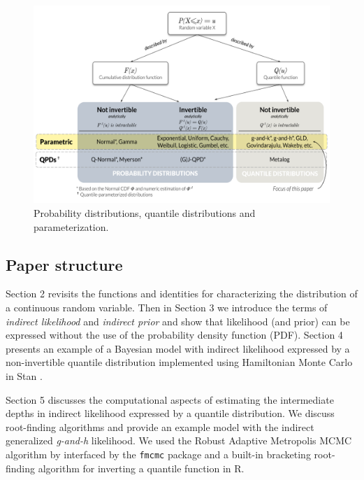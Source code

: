 \documentclass[
  12pt,
]{article}
\begin{document}
\begin{figure}

{\centering \includegraphics[width=6in]{img/QDs} 

}

\caption{Probability distributions, quantile distributions and parameterization.}\label{fig:qdist-chart}
\end{figure}

\hypertarget{paper-structure}{%
\subsection{Paper structure}\label{paper-structure}}

Section 2 revisits the functions and identities for characterizing the distribution of a continuous random variable. Then in Section 3 we introduce the terms of \emph{indirect likelihood} and \emph{indirect prior} and show that likelihood (and prior) can be expressed without the use of the probability density function (PDF). Section 4 presents an example of a Bayesian model with indirect likelihood expressed by a non-invertible quantile distribution implemented using Hamiltonian Monte Carlo in Stan \citep{standevelopmentteam2021RStanInterfaceStan}.

Section 5 discusses the computational aspects of estimating the intermediate depths in indirect likelihood expressed by a quantile distribution. We discuss root-finding algorithms and provide an example model with the indirect generalized \emph{g-and-h} \citep{haynes1997RobustnessRankingSelection} likelihood. We used the Robust Adaptive Metropolis MCMC algorithm by \citet{vihola2012RobustAdaptiveMetropolis} interfaced by the \texttt{fmcmc} package \citep{vegayon2019FmcmcFriendlyMCMC} and a built-in bracketing root-finding algorithm for inverting a quantile function in R\citep{rcoreteam2021LanguageEnvironmentStatistical}.
\end{document}
